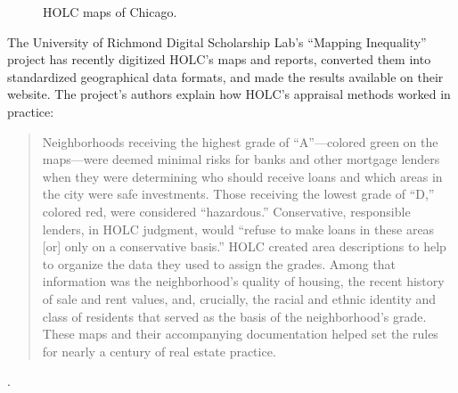 \begin{figure}
\begin{centering}

\end{centering}
\caption{HOLC maps of Chicago.}
\label{f:chicago-maps}
\end{figure}



The University of Richmond Digital Scholarship Lab's ``Mapping Inequality''
project has recently digitized HOLC's maps and reports, converted them into
standardized geographical data formats, and made the results available on their
website. The project's
authors explain how HOLC's appraisal methods worked in practice:
\begin{quote}
Neighborhoods receiving the highest grade of ``A''---colored green on the
maps---were deemed minimal risks for banks and other mortgage lenders when they
were determining who should receive loans and which areas in the city were safe
investments. Those receiving the lowest grade of ``D,'' colored red, were
considered ``hazardous.'' Conservative, responsible lenders, in HOLC judgment,
would ``refuse to make loans in these areas [or] only on a conservative
basis.'' HOLC created area descriptions to help to organize the data they used
to assign the grades. Among that information was the neighborhood's quality of
housing, the recent history of sale and rent values, and, crucially, the racial
and ethnic identity and class of residents that served as the basis of the
neighborhood's grade. These maps and their accompanying documentation helped
set the rules for nearly a century of real estate practice.
\end{quote}
.


